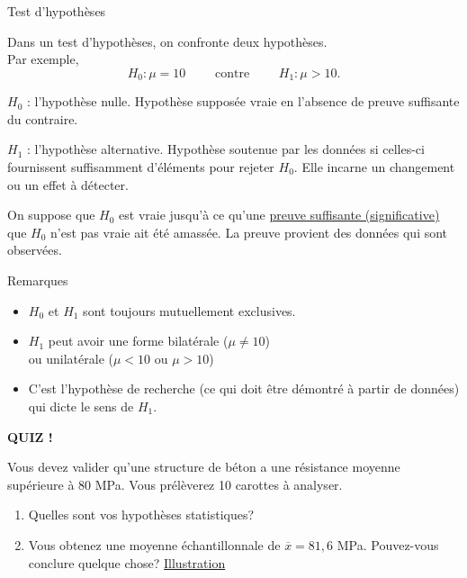 \documentclass{BeamerTemplate}
\begin{document}
\begin{frame}[t]{Test d'hypothèses}

\small
Dans un \alert{test d'hypothèses}, on confronte deux hypothèses.\\ %
Par exemple,
$$H_0 : \mu = 10 \qquad \mbox{ contre } \qquad  H_1 : \mu > 10.$$

\medskip
 \alert{$H_0$ : l'hypothèse nulle}. Hypothèse supposée vraie en l’absence de preuve suffisante du contraire.

\medskip

 \alert{$H_1$ : l'hypothèse alternative}.
Hypothèse soutenue par les données si celles-ci fournissent suffisamment d’éléments pour rejeter $H_0$. Elle incarne un changement ou un effet à détecter.

\medskip

On suppose que $H_0$ est vraie jusqu'à ce qu'une \underline{preuve suffisante (significative)} que $H_0$ n'est pas vraie ait été amassée. La preuve provient des données qui sont observées.

\end{frame}


\begin{frame}[t]{Remarques}
\begin{itemize}\itemsep4mm
\item $H_0$ et $H_1$ sont toujours mutuellement exclusives.
\item $H_1$ peut avoir une forme bilatérale ($\mu\ne 10$)\\ ou unilatérale ($\mu<10$ ou $\mu>10$)
\item C'est l'hypothèse de recherche (ce qui doit être démontré à partir de données) qui dicte le sens de $H_1$.

\end{itemize}
\end{frame}

\begin{frame}[t]{ }

\centerline{\LARGE\bf \alert{QUIZ !}}
\bigskip

Vous devez valider qu'une structure de béton a une résistance moyenne supérieure à 80 MPa. Vous prélèverez 10 carottes à analyser.
\bigskip

\begin{enumerate}\itemsep 15mm
\item Quelles sont vos hypothèses statistiques?
\item Vous obtenez une moyenne échantillonnale de $\overline x = 81,6$ MPa. Pouvez-vous conclure quelque chose? \href{https://jmiron.shinyapps.io/IntroTest/}{Illustration}
\end{enumerate}

\vspace{1.5cm}
\end{frame}
\end{document}
